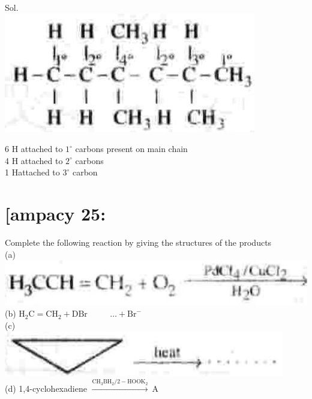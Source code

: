 \documentclass[10pt]{article}
\begin{document}
Sol.\\
\includegraphics[max width=\textwidth, center]{2025_01_28_8470952b98110cec3aabg-224(5)}

6 H attached to $1^{\circ}$ carbons present on main chain\\
4 H attached to $2^{\circ}$ carbons\\
1 Hattached to $3^{\circ}$ carbon

\section*{[ampacy 25:}
Complete the following reaction by giving the structures of the products\\
(a)\\
\includegraphics[max width=\textwidth, center]{2025_01_28_8470952b98110cec3aabg-224}\\
(b) $\mathrm{H}_{2} \mathrm{C}=\mathrm{CH}_{2}+\mathrm{DBr}$ $\qquad$ $\ldots+\mathrm{Br}^{-}$\\
(c)\\
\includegraphics[max width=\textwidth, center]{2025_01_28_8470952b98110cec3aabg-224(2)}\\
(d) 1,4-cyclohexadiene $\xrightarrow{\mathrm{CH}_{3} \mathrm{BH}_{2} / 2-\mathrm{HOOK}_{2}} \mathrm{~A}$ $\qquad$
\end{document}
